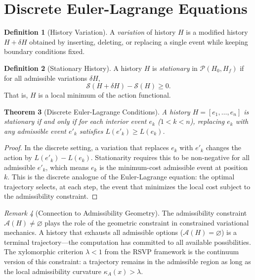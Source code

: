\documentclass[12pt, a4paper, openany]{book}
\theoremstyle{plain}
\newtheorem{theorem}{Theorem}[chapter]
\theoremstyle{definition}
\newtheorem{definition}[theorem]{Definition}
\theoremstyle{remark}
\newtheorem{remark}[theorem]{Remark}
\newcommand{\calA}{\mathcal{A}}
\begin{document}
\section{Discrete Euler-Lagrange Equations}

\begin{definition}[History Variation]
A \emph{variation} of history $H$ is a modified history $H + \delta H$ obtained
by inserting, deleting, or replacing a single event while keeping boundary
conditions fixed.
\end{definition}

\begin{definition}[Stationary History]
A history $H$ is \emph{stationary} in $\mathcal{P}(H_0, H_f)$ if for all
admissible variations $\delta H$,
\[
\mathcal{S}(H + \delta H) - \mathcal{S}(H) \geq 0.
\]
That is, $H$ is a local minimum of the action functional.
\end{definition}

\begin{theorem}[Discrete Euler-Lagrange Conditions]
A history $H = [e_1, \ldots, e_n]$ is stationary if and only if for each
interior event $e_k$ ($1 < k < n$), replacing $e_k$ with any admissible
event $e'_k$ satisfies $L(e'_k) \geq L(e_k)$.
\end{theorem}

\begin{proof}
In the discrete setting, a variation that replaces $e_k$ with $e'_k$ changes
the action by $L(e'_k) - L(e_k)$. Stationarity requires this to be non-negative
for all admissible $e'_k$, which means $e_k$ is the minimum-cost admissible event
at position $k$. This is the discrete analogue of the Euler-Lagrange equation:
the optimal trajectory selects, at each step, the event that minimizes the local
cost subject to the admissibility constraint.
\end{proof}

\begin{remark}[Connection to Admissibility Geometry]
The admissibility constraint $\calA(H) \neq \varnothing$ plays the role of the
geometric constraint in constrained variational mechanics. A history that exhausts
all admissible options ($\calA(H) = \varnothing$) is a terminal trajectory---the
computation has committed to all available possibilities. The xylomorphic criterion
$\lambda < 1$ from the RSVP framework is the continuum version of this constraint:
a trajectory remains in the admissible region as long as the local admissibility
curvature $\kappa_A(x) > \lambda$.
\end{remark}
\end{document}
